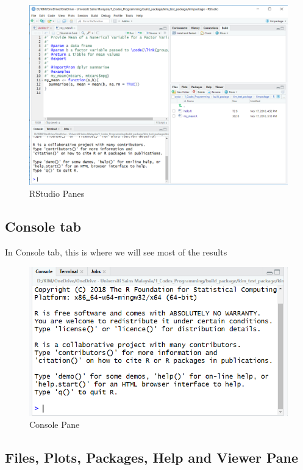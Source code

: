 \documentclass[
]{book}
\begin{document}
\begin{figure}
\centering
\includegraphics{rstudio_all.PNG}
\caption{RStudio Panes}
\end{figure}

\hypertarget{console-tab}{%
\subsection{Console tab}\label{console-tab}}

In Console tab, this is where we will see most of the results

\begin{figure}
\centering
\includegraphics{console.PNG}
\caption{Console Pane}
\end{figure}

\hypertarget{files-plots-packages-help-and-viewer-pane}{%
\subsection{Files, Plots, Packages, Help and Viewer Pane}\label{files-plots-packages-help-and-viewer-pane}}
\end{document}
